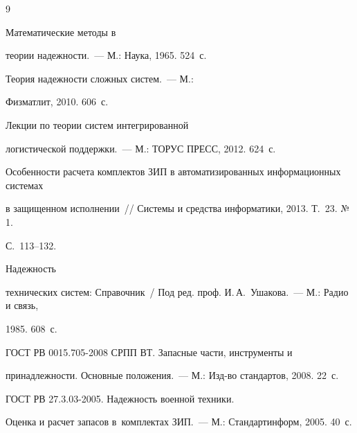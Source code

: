 {\small\frenchspacing

{%


\begin{thebibliography}{9}


       Математические методы в

теории надежности.~--- М.: Наука, 1965. 524~с.


       Теория надежности сложных систем.~--- М.:

Физматлит, 2010. 606~с.


       Лекции по теории систем интегрированной

логистической поддержки.~--- М.: ТОРУС ПРЕСС, 2012. 624~с.



Особенности расчета комплектов ЗИП в автоматизированных информационных системах

в защищенном исполнении~/\!\!/ Системы и средства информатики, 2013. Т.~23. №\,1.

С.~113--132.


       Надежность

технических систем: Справочник~/ Под ред. проф. И.\,А.~Ушакова.~--- М.: Радио и связь,

1985. 608~с.


      ГОСТ РВ 0015.705-2008 СРПП ВТ. Запасные части, инструменты и

принадлежности. Основные положения.~--- М.: Изд-во стандартов, 2008. 22~с.


      ГОСТ РВ 27.3.03-2005. Надежность военной техники.

      Оценка и расчет запасов в~комплектах ЗИП.~--- М.: Стандартинформ, 2005. 40~с.



      \end{thebibliography}

} }





